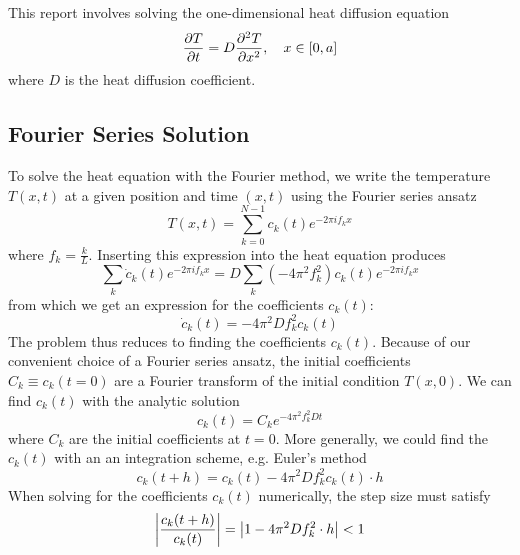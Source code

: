 \documentclass[11pt, a4paper]{article}
\begin{document}
\vspace{2mm}
This report involves solving the one-dimensional heat diffusion equation
\begin{equation*}
	\pdv{T}{t} = D \pdv[2]{T}{x}, \quad x \in [0, a]
\end{equation*}
where $ D $ is the heat diffusion coefficient.

\subsection{Fourier Series Solution} \label{spec:ss:fourier-theory}
To solve the heat equation with the Fourier method, we write the temperature $ T(x, t) $ at a given position and time $ (x, t) $ using the Fourier series ansatz
\begin{equation*}
	T(x, t) = \sum_{k=0}^{N-1}c_{k}(t)e^{-2\pi i f_{k} x}
\end{equation*}
where $ f_{k} = \frac{k}{L} $. Inserting this expression into the heat equation produces
\begin{equation*}
	\sum_{k}\dot{c}_{k}(t)e^{-2\pi i f_{k}x} = D \sum_{k}(-4\pi^{2}f_{k}^{2}) c_{k}(t)e^{-2\pi i f_{k} x}
\end{equation*}
from which we get an expression for the coefficients $ c_{k}(t) $:
\begin{equation*}
	\dot{c}_{k}(t) = -4\pi^{2}Df_{k}^{2}c_{k}(t)
\end{equation*}
The problem thus reduces to finding the coefficients $ c_{k}(t) $. Because of our convenient choice of a Fourier series ansatz, the initial coefficients $ C_{k} \equiv c_{k}(t=0) $ are a Fourier transform of the initial condition $ T(x, 0) $. We can find $ c_{k}(t) $ with the analytic solution
\begin{equation}
	c_{k}(t) = C_{k}e^{-4\pi^{2}f_{k}^{2}Dt}  \label{spec:eq:coefficients-analytic}
\end{equation}
where $ C_{k} $ are the initial coefficients at $ t = 0 $. More generally, we could find the $ c_{k}(t) $ with an an integration scheme, e.g. Euler's method
\begin{equation}
	c_{k}(t+h) = c_{k}(t) -4\pi^{2}Df_{k}^{2}c_{k}(t) \cdot h \label{spec:eq:coefficients-euler}
\end{equation}
When solving for the coefficients $ c_{k}(t) $ numerically, the step size must satisfy
\begin{equation*}
	\abs{\frac{c_{k}(t+h)}{c_{k}(t)}} = \abs{1 - 4\pi^{2}Df_{k}^{2}\cdot h} < 1
\end{equation*}
\end{document}

